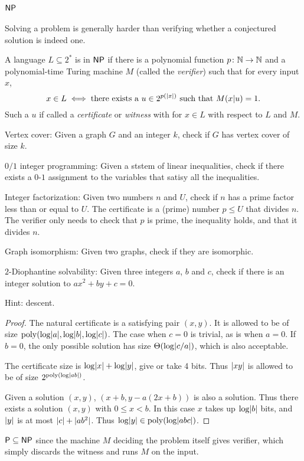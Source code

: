 \section{$\NP$} \label{sec:NP}
Solving a problem is generally harder than verifying whether a conjectured
solution is indeed one.
\begin{definition}[$\NP$] \label{def:NP}
    A language $L \subseteq 2^*$ is in $\NP$ if there is a polynomial
    function $p\colon \mathbb{N} \to \mathbb{N}$ and a polynomial-time Turing machine $M$
    (called the \emph{verifier}) such that for every input $x$, \[
        x \in L \iff \text{there exists a } u \in 2^{p(\lvert x\rvert)}
            \text{ such that } M(x \vert u) = 1.
    \] Such a $u$ if called a \emph{certificate} or \emph{witness} with for
    $x \in L$ with respect to $L$ and $M$.
\end{definition}
\begin{examples}
    \item Vertex cover: Given a graph $G$ and an integer $k$, check if $G$
        has vertex cover of size $k$.
    \item $0/1$ integer programming: Given a ststem of linear inequalities,
        check if there exists a $0$-$1$ assignment to the variables that
        satisy all the inequalities.
    \item Integer factorization: Given two numbers $n$ and $U$, check if
        $n$ has a prime factor less than or equal to $U$.
        The certificate is a (prime) number $p \le U$ that divides $n$.
        The verifier only needs to check that $p$ is prime, the inequality
        holds, and that it divides $n$.
    \item Graph isomorphism: Given two graphs, check if they are isomorphic.
    \item $2$-Diophantine solvability:
        Given three integers $a$, $b$ and $c$, check if there is an
        integer solution to $ax^2 + by + c = 0$.

        Hint: descent.
        \begin{proof}
            The natural certificate is a satisfying pair $(x, y)$.
            It is allowed to be of size $\operatorname{poly}(\log \lvert a\rvert, \log \lvert b\rvert,
            \log \lvert c\rvert)$.
            The case when $c = 0$ is trivial, as is when $a = 0$.
            If $b = 0$, the only possible solution has size
            $\Theta(\log \lvert c/a\rvert)$, which is also acceptable.

            The certificate size is $\log \lvert x\rvert + \log \lvert y\rvert$, give or
            take 4 bits.
            Thus $\lvert xy\rvert$ is allowed to be of size
            $2^{\operatorname{poly}(\log \lvert ab\rvert)}$.

            Given a solution $(x, y)$, $(x + b, y - a(2x + b))$ is also a
            solution.
            Thus there exists a solution $(x, y)$ with $0 \le x < b$.
            In this case $x$ takes up $\log \lvert b\rvert$ bits,
            and $\lvert y\rvert$ is at most $\lvert c\rvert + \lvert ab^2\rvert$.
            Thus $\log \lvert y\rvert \in \operatorname{poly}(\log \lvert abc\rvert)$.
        \end{proof}
\end{examples}

$\mathsf{P} \subseteq \mathsf{NP}$ since the machine $M$ deciding the problem itself gives
verifier, which simply discards the witness and runs $M$ on the input.

